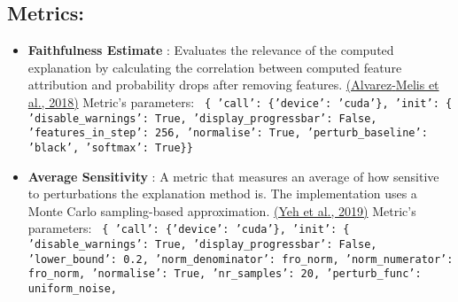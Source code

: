 \documentclass{article}%
\begin{document}
\subsection*{Metrics:}%
\label{subsec:Metrics}%
\begin{itemize}%
\item%
\textbf{Faithfulness Estimate}%
: Evaluates the relevance of the computed explanation by calculating the correlation between computed feature attribution and probability drops after removing features.%
\href{https://arxiv.org/abs/1806.07538}{(Alvarez{-}Melis et al., 2018)}%
\newline%
%
Metric's parameters: \newline%
%
\texttt{%
\{   'call': \{'device': 'cuda'\},\newline%
    'init': \{   'disable\_warnings': True,\newline%
                'display\_progressbar': False,\newline%
                'features\_in\_step': 256,\newline%
                'normalise': True,\newline%
                'perturb\_baseline': 'black',\newline%
                'softmax': True\}\} \newline%
%
}%
\item%
\textbf{Average Sensitivity}%
: A metric that measures an average of how sensitive to perturbations the explanation method is. The implementation uses a Monte Carlo sampling{-}based approximation.%
\href{https://arxiv.org/abs/1901.09392}{(Yeh et al., 2019)}%
\newline%
%
Metric's parameters: \newline%
%
\texttt{%
\{   'call': \{'device': 'cuda'\},\newline%
    'init': \{   'disable\_warnings': True,\newline%
                'display\_progressbar': False,\newline%
                'lower\_bound': 0.2,\newline%
                'norm\_denominator': fro\_norm,\newline%
                'norm\_numerator': fro\_norm,\newline%
                'normalise': True,\newline%
                'nr\_samples': 20,\newline%
                'perturb\_func': uniform\_noise,\newline%
}
\end{itemize}
\end{document}
